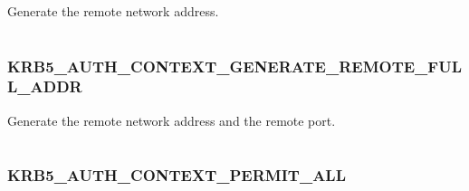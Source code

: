 \documentclass[letterpaper,10pt,english]{sphinxmanual}
\begin{document}
Generate the remote network address.

\begin{tabulary}{\linewidth}{|L|L|}
\hline

 & 
\\\hline
\end{tabulary}



\subsubsection{KRB5\_AUTH\_CONTEXT\_GENERATE\_REMOTE\_FULL\_ADDR}
\label{appdev/refs/macros/KRB5_AUTH_CONTEXT_GENERATE_REMOTE_FULL_ADDR:krb5-auth-context-generate-remote-full-addr}\label{appdev/refs/macros/KRB5_AUTH_CONTEXT_GENERATE_REMOTE_FULL_ADDR::doc}\label{appdev/refs/macros/KRB5_AUTH_CONTEXT_GENERATE_REMOTE_FULL_ADDR:krb5-auth-context-generate-remote-full-addr-data}

\begin{fulllineitems}
\label{appdev/refs/macros/KRB5_AUTH_CONTEXT_GENERATE_REMOTE_FULL_ADDR:KRB5_AUTH_CONTEXT_GENERATE_REMOTE_FULL_ADDR}
\end{fulllineitems}


Generate the remote network address and the remote port.

\begin{tabulary}{\linewidth}{|L|L|}
\hline

 & 
\\\hline
\end{tabulary}



\subsubsection{KRB5\_AUTH\_CONTEXT\_PERMIT\_ALL}
\label{appdev/refs/macros/KRB5_AUTH_CONTEXT_PERMIT_ALL:krb5-auth-context-permit-all}\label{appdev/refs/macros/KRB5_AUTH_CONTEXT_PERMIT_ALL:krb5-auth-context-permit-all-data}\label{appdev/refs/macros/KRB5_AUTH_CONTEXT_PERMIT_ALL::doc}

\begin{fulllineitems}
\label{appdev/refs/macros/KRB5_AUTH_CONTEXT_PERMIT_ALL:KRB5_AUTH_CONTEXT_PERMIT_ALL}
\end{fulllineitems}
\end{document}
